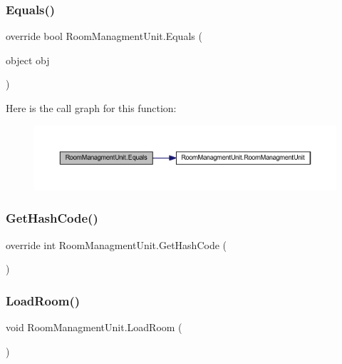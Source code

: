 \subsubsection{\texorpdfstring{Equals()}{Equals()}}
{\footnotesize\ttfamily override bool Room\+Managment\+Unit.\+Equals (\begin{DoxyParamCaption}\item[{object}]{obj }\end{DoxyParamCaption})}

Here is the call graph for this function\+:
\nopagebreak
\begin{figure}[H]
\begin{center}
\leavevmode
\includegraphics[width=350pt]{class_room_managment_unit_a663946fa33bad407b32d75aea8e7d5d9_cgraph}
\end{center}
\end{figure}
\mbox{\label{class_room_managment_unit_ad76ae60e41c36a71934ff9cccca60039}} 
\subsubsection{\texorpdfstring{Get\+Hash\+Code()}{GetHashCode()}}
{\footnotesize\ttfamily override int Room\+Managment\+Unit.\+Get\+Hash\+Code (\begin{DoxyParamCaption}{ }\end{DoxyParamCaption})}

\mbox{\label{class_room_managment_unit_a7f34dfb62166ebcbd2a314f0bcdb61e9}} 
\subsubsection{\texorpdfstring{Load\+Room()}{LoadRoom()}}
{\footnotesize\ttfamily void Room\+Managment\+Unit.\+Load\+Room (\begin{DoxyParamCaption}{ }\end{DoxyParamCaption})}

